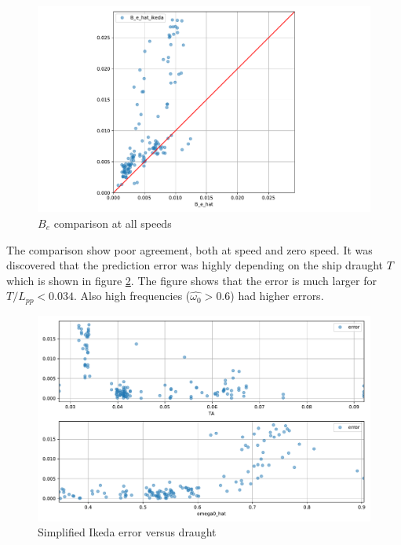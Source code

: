 \begin{figure}[H]
    \centering
    \includegraphics[width=0.9\columnwidth]{figures/B_e_hat_ikeda.pdf}
    \caption{$\hat{B_e}$ comparison at all speeds}
    \label{fig:B_e_hat_ikeda}
\end{figure}

The comparison show poor agreement, both at speed and zero speed. It was discovered that the prediction error was highly depending on the ship draught $T$ which is shown in figure  \ref{fig:B_e_hat_error}.
The figure shows that the error is much larger for $T/L_{pp}<0.034$. Also high frequencies ($\hat{\omega_0} > 0.6$) had higher errors.

\begin{figure}[H]
    \centering
    \includegraphics[width=\columnwidth]{figures/B_e_hat_error.pdf}
    \caption{Simplified Ikeda error versus draught}
    \label{fig:B_e_hat_error}
\end{figure}

